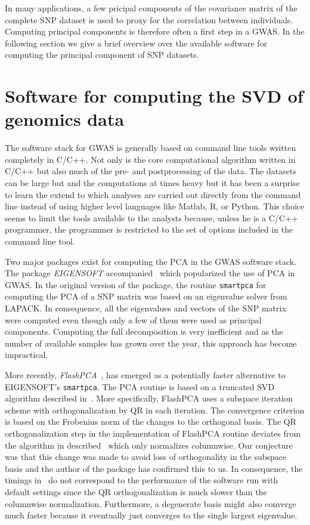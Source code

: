 \documentclass[final,leqno]{siamltex1213}
\begin{document}
In many applications, a few pricipal components of the covariance matrix of the complete SNP dataset is used to proxy for the correlation between individuals. Computing principal components is therefore often a first step in a GWAS. In the following section we give a brief overview over the available software for computing the principal component of SNP datasets.

\section{Software for computing the SVD of genomics data}

The software stack for GWAS is generally based on command line tools written completely in C/C++. Not only is the core computational algorithm written in C/C++ but also much of the pre- and postprocessing of the data. The datasets can be large but and the computations at times heavy but it has been a surprise to learn the extend to which analyses are carried out directly from the command line instead of using higher level languages like Matlab, R, or Python. This choice seems to limit the tools available to the analysts because, unless he is a C/C++ programmer, the programmer is restricted to the set of options included in the command line tool.

Two major packages exist for computing the PCA in the GWAS software stack. The package \emph{EIGENSOFT} accompanied~\cite{patterson2006population} which popularized the use of PCA in GWAS. In the original version of the package, the routine \texttt{smartpca} for computing the PCA of a SNP matrix was based on an eigenvalue solver from LAPACK. In consequence, all the eigenvalues and vectors of the SNP matrix were computed even though only a few of them were used as principal components. Computing the full decomposition is very inefficient and as the number of available samples has grown over the year, this approach has become impractical.

More recently, \emph{FlashPCA}~\cite{abraham2014fast}, has emerged as a potentially faster alternative to EIGENSOFT's \texttt{smartpca}. The PCA routine is based on a truncated SVD algorithm described in~\cite{halko2011finding}. More specifically, FlashPCA uses a subspace iteration scheme with orthogonalization by QR in each iteration. The convergence criterion is based on the Frobenius norm of the changes to the orthogonal basis. The QR orthogonalization step in the implementation of FlashPCA routine deviates from the algorithm in described~\cite{abraham2014fast} which only normalizes columnwise. Our conjecture was that this change was made to avoid loss of orthogonality in the subspace basis and the author of the package has confirmed this to us. In consequence, the timings in~\cite{abraham2014fast} do not correspond to the performance of the software run with default settings since the QR orthogonalization is much slower than the columnwise normalization. Furthermore, a degenerate basis might also converge much faster because it eventually just converges to the single largest eigenvalue.
\end{document}
